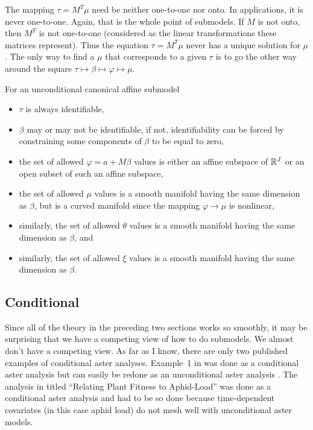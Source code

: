 The mapping $\tau = M^T \mu$ need be neither one-to-one nor onto.
In applications, it is never one-to-one.  Again, that is the whole
point of submodels.  If $M$ is not onto, then $M^T$ is not one-to-one
(considered as the linear transformations these matrices represent).
Thus the equation $\tau = M^T \mu$ never has a unique solution for $\mu$.
The only way to find a $\mu$ that corresponds to a given $\tau$ is to go
the other way around
the square $\tau \mapsto \beta \mapsto \varphi \mapsto \mu$.

For an unconditional canonical affine submodel
\begin{itemize}
\item $\tau$ is always identifiable,
\item $\beta$ may or may not be identifiable, if not, identifiability can
    be forced by constraining some components of $\beta$ to be equal to zero,
\item the set of allowed $\varphi = a + M \beta$ values is either an affine
    subspace of $\mathbb{R}^J$ or an open subset of such an affine subspace,
\item the set of allowed $\mu$ values is a smooth manifold having the same
    dimension as $\beta$, but is a curved manifold since the mapping
    $\varphi \to \mu$ is nonlinear,
\item similarly, the set of allowed $\theta$ values is a smooth manifold
    having the same dimension as $\beta$, and
\item similarly, the set of allowed $\xi$ values is a smooth manifold
    having the same dimension as $\beta$.
\end{itemize}

\subsection{Conditional}

Since all of the theory in the preceding two sections works so smoothly,
it may be surprising that we have a competing view of how to do submodels.
We almost don't have a competing view.  As far as I know, there are only
two published examples of conditional aster analyses.  Example~{1} in
\citet{aster2} was done as a conditional aster analysis but can easily
be redone as an unconditional aster analysis
\citep[Slide Deck~4, slides 47ff.]{geyer-8931-aster}.
The analysis in \citet{aster-aphid} titled
``Relating Plant Fitness to Aphid-Load'' was done as a conditional aster
analysis and had to be so done because time-dependent covariates (in this
case aphid load) do not mesh well with unconditional aster models.


